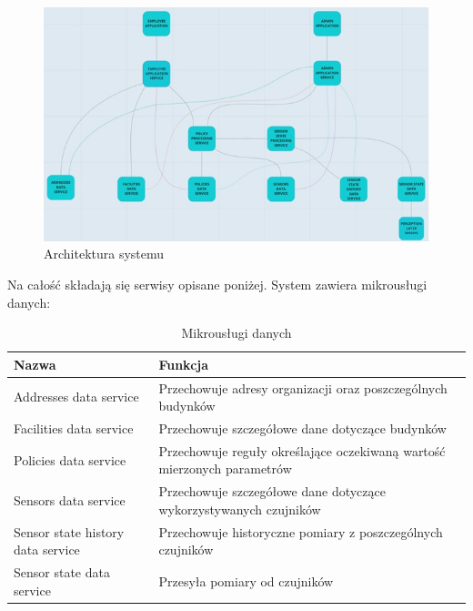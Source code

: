 \documentclass[11pt, a4]{article} %
\begin{document}
\begin{figure}[h] %
    \centering %
    \includegraphics[width=1\textwidth]{architektura.jpg} %
    \caption{Architektura systemu} %
    \label{fig:architektura-systemu} %
\end{figure}

Na całość składają się serwisy opisane poniżej. System zawiera mikrousługi danych:

\begin{table}[!ht]
    \caption{Mikrousługi danych}
    \label{tab:mikrouslugi-danych}
    \begin{tabularx}{1\textwidth} { 
        | >{\raggedright\arraybackslash}X        
        | >{\raggedleft\arraybackslash}X | }
        \hline
       Nazwa & Funkcja \\
       \hline
       Addresses data service & 
       Przechowuje adresy organizacji oraz poszczególnych budynków \\
       \hline
       Facilities data service &
       Przechowuje szczegółowe dane dotyczące budynków \\
       \hline
       Policies data service & 
       Przechowuje reguły określające oczekiwaną wartość mierzonych parametrów \\
       \hline
       Sensors data service &
       Przechowuje szczegółowe dane dotyczące wykorzystywanych czujników \\
       \hline
       Sensor state history data service &
       Przechowuje historyczne pomiary z poszczególnych czujników \\
       \hline
       Sensor state data service &
       Przesyła pomiary od czujników \\
       \hline
    \end{tabularx}
\end{table}
\end{document}

